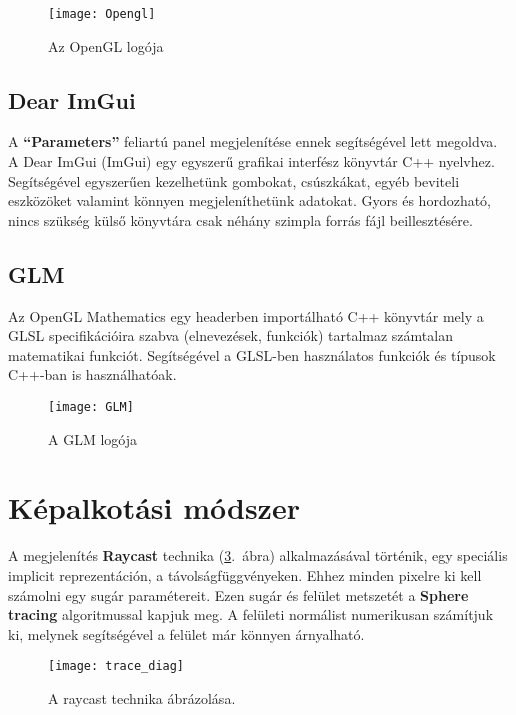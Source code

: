 \begin{figure}[H]
	\centering
	\texttt{[image: Opengl]}
	\caption{Az OpenGL logója}
	\label{fig:Opengl}
\end{figure}

\subsection{Dear ImGui}
A \textbf{``Parameters''} feliartú panel megjelenítése ennek segítségével lett megoldva. A Dear ImGui (ImGui) egy egyszerű grafikai interfész könyvtár C++ nyelvhez. Segítségével egyszerűen kezelhetünk gombokat, csúszkákat, egyéb beviteli eszközöket valamint könnyen megjeleníthetünk adatokat. Gyors és hordozható, nincs szükség külső könyvtára csak néhány szimpla forrás fájl beillesztésére. \cite{ocornuti13:online}

\subsection{GLM}

Az OpenGL Mathematics egy headerben importálható C++ könyvtár mely a GLSL specifikációira szabva (elnevezések, funkciók) tartalmaz számtalan matematikai funkciót. Segítségével a GLSL-ben használatos funkciók és típusok C++-ban is használhatóak. \cite{OpenGLMa34:online}

\begin{figure}[H]
	\centering
	\texttt{[image: GLM]}
	\caption{A GLM logója}
	\label{fig:GLM}
\end{figure}

\section{Képalkotási módszer}
A megjelenítés \textbf{Raycast} technika (\ref{fig:trace_diag}.~ábra) alkalmazásával történik, egy speciális implicit reprezentáción, a távolságfüggvényeken. Ehhez minden pixelre ki kell számolni egy sugár paramétereit. Ezen sugár és felület metszetét a \textbf{Sphere tracing} algoritmussal kapjuk meg. A felületi normálist numerikusan számítjuk ki, melynek segítségével a felület már könnyen árnyalható.

\begin{figure}[H]
	\centering
	\texttt{[image: trace\_diag]}
	\caption{A raycast technika ábrázolása. \cite{FileRayt97:online}}
	\label{fig:trace_diag}
\end{figure}

